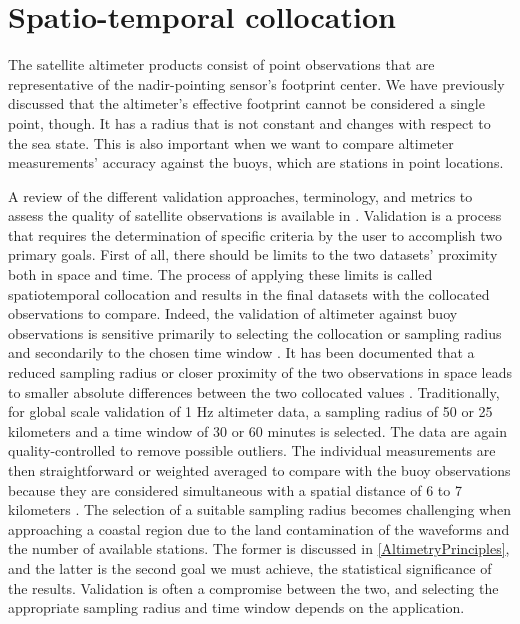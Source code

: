 
\section{Spatio-temporal collocation}\label{collocation}


The satellite altimeter products consist of point observations that are representative of the nadir-pointing sensor’s footprint center. We have previously discussed that the altimeter's effective footprint cannot be considered a single point, though. It has a radius that is not constant and changes with respect to the sea state. This is also important when we want to compare altimeter measurements' accuracy against the buoys, which are stations in point locations.

A review of the different validation approaches, terminology, and metrics to assess the quality of satellite observations is available in \cite{Loew2017}. Validation is a process that requires the determination of specific criteria by the user to accomplish two primary goals. First of all, there should be limits to the two datasets' proximity both in space and time. The process of applying these limits is called spatiotemporal collocation and results in the final datasets with the collocated observations to compare. Indeed, the validation of altimeter against buoy observations is sensitive primarily to selecting the collocation or sampling radius and secondarily to the chosen time window \cite{Hwang1998}. It has been documented that a reduced sampling radius or closer proximity of the two observations in space leads to smaller absolute differences between the two collocated values \cite{Monaldo1988}. Traditionally, for global scale validation of 1 Hz altimeter data, a sampling radius of 50 or 25 kilometers and a time window of 30 or 60 minutes is selected. The data are again quality-controlled to remove possible outliers. The individual measurements are then straightforward or weighted averaged to compare with the buoy observations because they are considered simultaneous with a spatial distance of 6 to 7 kilometers \cite{Durrant2009, Queffeulou2004, Yang2019}. The selection of a suitable sampling radius becomes challenging when approaching a coastal region due to the land contamination of the waveforms and the number of available stations. The former is discussed in \ref{AltimetryPrinciples}, and the latter is the second goal we must achieve, the statistical significance of the results. Validation is often a compromise between the two, and selecting the appropriate sampling radius and time window depends on the application.



